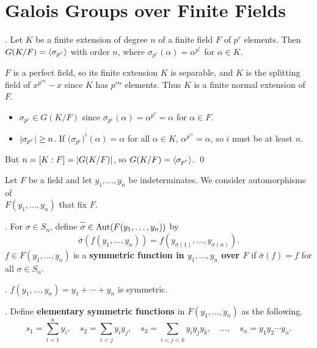\section*{Galois Groups over Finite Fields}

\thm. Let \(K\) be a finite extension of degree \(n\) of a finite field \(F\) of \(p^r\) elements. Then \(G(K/F) = \left\langle \sigma_{p^r} \right\rangle\) with order \(n\), where \(\sigma_{p^r}(\alpha) = \alpha^{p^r}\) for \(\alpha \in K\).

\pf \(F\) is a perfect field, so its finite extension \(K\) is separable, and \(K\) is the splitting field of \(x^{p^{rn}} - x\) since \(K\) has \(p^{rn}\) elements. Thus \(K\) is a finite normal extension of \(F\).
\begin{itemize}
    \item \(\sigma_{p^r} \in G(K/F)\) since \(\sigma_{p^r}(\alpha) = \alpha^{p^r} = \alpha\) for \(\alpha \in F\).
    \item \(\left| \sigma_{p^r} \right| \geq n\). If \(\bigl(\sigma_{p^r}\bigr)^i(\alpha) = \alpha\) for all \(\alpha \in K\), \(\alpha^{p^{ri}} = \alpha\), so \(i\) must be at least \(n\).
\end{itemize}
But \(n = [K : F] = \left| G(K/F) \right|\), so \(G(K/F) = \left\langle \sigma_{p^r} \right\rangle\). \qed


Let \(F\) be a field and let \(y_1, \dots, y_n\) be indeterminates. We consider automorphisms of \\\(F(y_1, \dots, y_n)\) that fix \(F\).

.  For \(\sigma \in S_n\), define \(\bar{\sigma} \in \Aut(F(y_1, \dots, y_n))\) by
\[
    \bar{\sigma}(f(y_1, \dots, y_n)) = f(y_{\sigma(1)}, \dots, y_{\sigma(n)}).
\]
\(f \in F(y_1, \dots, y_n)\) is a \textbf{symmetric function in \(y_1, \dots, y_n\) over \(F\)} if \(\bar{\sigma}(f) = f\) for all \(\sigma \in S_n\).

\ex. \(f(y_1, \dots, y_n) = y_1 + \cdots + y_n\) is symmetric.

\pagebreak

.  Define \textbf{elementary symmetric functions} in \(F(y_1, \dots, y_n)\) as the following.
\[
    s_1 = \sum_{i=1}^n y_i, \quad s_2 = \sum_{i < j} y_i y_j, \quad s_3 = \sum_{i < j < k} y_i y_j y_k, \quad \dots, \quad s_n = y_1 y_2 \cdots y_n.
\]


